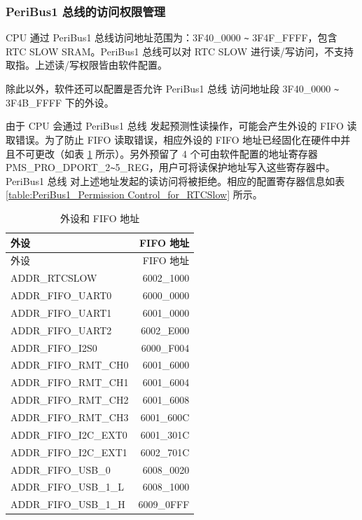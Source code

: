 \documentclass[main\_\_CN.tex]{subfiles}
\begin{document}
\subsubsection{PeriBus1 总线的访问权限管理}
CPU 通过 PeriBus1 总线访问地址范围为：\hexprefix{}3F40\_0000 \verb+~+ \hexprefix{}3F4F\_FFFF，包含 RTC SLOW SRAM。PeriBus1 总线可以对 RTC SLOW 进行读/写访问，不支持取指。上述读/写权限皆由软件配置。

除此以外，软件还可以配置是否允许 PeriBus1 总线 访问地址段 \hexprefix{}3F40\_0000 \verb+~+ \hexprefix{}3F4B\_FFFF 下的外设。

由于 CPU 会通过 PeriBus1 总线 发起预测性读操作，可能会产生外设的 FIFO 读取错误。为了防止 FIFO 读取错误，相应外设的 FIFO 地址已经固化在硬件中并且不可更改（如表 \ref{FIFO Address and Corresponding Peripherals} 所示）。另外预留了 4 个可由软件配置的地址寄存器 PMS\_PRO\_DPORT\_2\verb+~+5\_REG，用户可将读保护地址写入这些寄存器中。PeriBus1 总线 对上述地址发起的读访问将被拒绝。相应的配置寄存器信息如表 \ref{table:PeriBus1_Permission Control_for_RTCSlow} 所示。

\begin{longtable}[c]{|m{5cm}|r|}
\caption{外设和 FIFO 地址}\label{FIFO Address and Corresponding Peripherals}
\\\hline
\rowcolor{lightgray}
外设 & FIFO 地址 \\\hline
    \hline
    \endfirsthead
    \hline
    \rowcolor{lightgray}
    外设 & FIFO 地址 \\\hline
    \hline
    \endhead
    \endfoot
    \hline
    \endlastfoot
ADDR\_RTCSLOW & \hexprefix{}6002\_1000\\\hline
ADDR\_FIFO\_UART0 & \hexprefix{}6000\_0000\\\hline
ADDR\_FIFO\_UART1 & \hexprefix{}6001\_0000\\\hline
ADDR\_FIFO\_UART2 & \hexprefix{}6002\_E000\\\hline
ADDR\_FIFO\_I2S0 & \hexprefix{}6000\_F004\\\hline
ADDR\_FIFO\_RMT\_CH0 & \hexprefix{}6001\_6000\\\hline
ADDR\_FIFO\_RMT\_CH1 & \hexprefix{}6001\_6004\\\hline
ADDR\_FIFO\_RMT\_CH2 & \hexprefix{}6001\_6008\\\hline
ADDR\_FIFO\_RMT\_CH3 & \hexprefix{}6001\_600C\\\hline
ADDR\_FIFO\_I2C\_EXT0 & \hexprefix{}6001\_301C\\\hline
ADDR\_FIFO\_I2C\_EXT1 & \hexprefix{}6002\_701C\\\hline
ADDR\_FIFO\_USB\_0 & \hexprefix{}6008\_0020\\\hline
ADDR\_FIFO\_USB\_1\_L & \hexprefix{}6008\_1000\\\hline
ADDR\_FIFO\_USB\_1\_H & \hexprefix{}6009\_0FFF\\\hline

\end{longtable}
\end{document}
